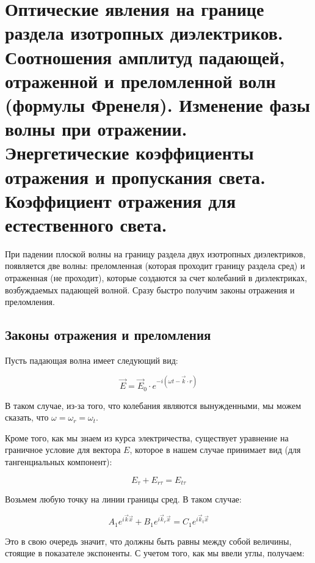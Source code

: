\section{Оптические явления на границе раздела изотропных диэлектриков. Соотношения амплитуд падающей, отраженной и преломленной волн (формулы Френеля). Изменение фазы волны при отражении. Энергетические коэффициенты отражения и пропускания света. Коэффициент отражения для естественного света.}



При падении плоской волны на границу раздела двух изотропных диэлектриков, появляется две волны: преломленная (которая проходит границу раздела сред) и отраженная (не проходит), которые создаются за счет колебаний в диэлектриках, возбуждаемых падающей волной. Сразу быстро получим законы отражения и преломления.

\subsection{Законы отражения и преломления}

Пусть падающая волна имеет следующий вид:

\begin{equation*}
\vec{E} = \vec{E}_0 \cdot e^{-i (\omega t - \vec{k} \cdot r)}
\end{equation*}

В таком случае, из-за того, что колебания являются вынужденными, мы можем сказать, что $\omega = \omega_r = \omega_t$.

Кроме того, как мы знаем из курса электричества, существует уравнение на граничное условие для вектора $E$, которое в нашем случае принимает вид (для тангенциальных компонент):

\begin{equation*}
E_\tau + E_{r\tau} = E_{t\tau}
\end{equation*}

Возьмем любую точку на линии границы сред. В таком случае:

\begin{equation*}
A_1 e^{i \vec{k} \vec{x}} + B_1 e^{i \vec{k}_r \vec{x}} = C_1 e^{i \vec{k}_t \vec{x}}
\end{equation*}

Это в свою очередь значит, что должны быть равны между собой величины, стоящие в показателе экспоненты. С учетом того, как мы ввели углы, получаем:

